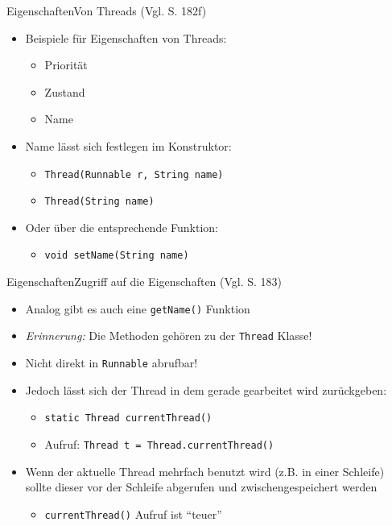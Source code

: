 \begin{frame}{Eigenschaften}{Von Threads (Vgl. \cite{ullenboom2014java} S. 182f)}
    \begin{itemize}
        \item Beispiele für Eigenschaften von Threads:
        \begin{itemize}
            \item Priorität
            \item Zustand
            \item Name
        \end{itemize}
        \item Name lässt sich festlegen im Konstruktor:
        \begin{itemize}
            \item \texttt{Thread(Runnable r, String name)}
            \item \texttt{Thread(String name)}
        \end{itemize}
        \item Oder über die entsprechende Funktion:
        \begin{itemize}
            \item \texttt{void setName(String name)}
        \end{itemize}
    \end{itemize}
\end{frame}

\begin{frame}{Eigenschaften}{Zugriff auf die Eigenschaften (Vgl. \cite{ullenboom2014java} S. 183)}
    \begin{itemize}
        \item Analog gibt es auch eine \texttt{getName()} Funktion
        \item \textit{Erinnerung:} Die Methoden gehören zu der \texttt{Thread} Klasse!
        \item Nicht direkt in \texttt{Runnable} abrufbar!
        \item Jedoch lässt sich der Thread in dem gerade gearbeitet wird zurückgeben:
        \begin{itemize}
            \item \texttt{static Thread currentThread()}
            \item Aufruf: \texttt{Thread t = Thread.currentThread()}
        \end{itemize}
        \item Wenn der aktuelle Thread mehrfach benutzt wird (z.B. in einer Schleife) sollte dieser vor der Schleife abgerufen und zwischengespeichert werden
        \begin{itemize}
            \item \texttt{currentThread()} Aufruf ist "`teuer"'
        \end{itemize}
    \end{itemize}
\end{frame}

